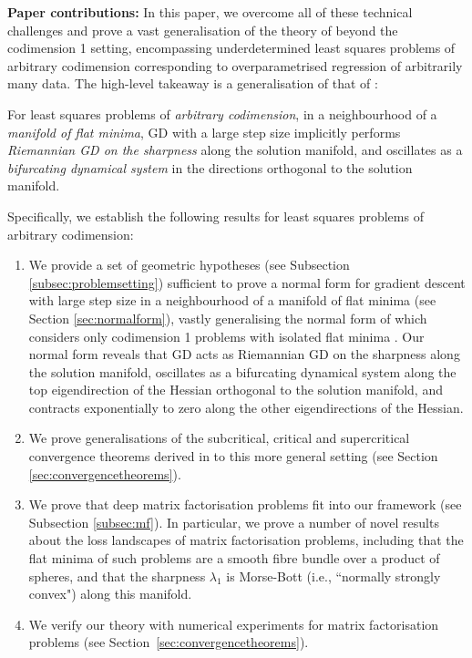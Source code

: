 \documentclass{article}
\theoremstyle{plain}
\theoremstyle{definition}
\theoremstyle{remark}
\begin{document}
\textbf{Paper contributions:} In this paper, we overcome all of these technical challenges and prove a vast generalisation of the theory of \cite{macdonaldeos} beyond the codimension 1 setting, encompassing underdetermined least squares problems of arbitrary codimension corresponding to overparametrised regression of arbitrarily many data. The high-level takeaway is a generalisation of that of \cite{macdonaldeos}:

\begin{tcolorbox}
\centering
For least squares problems of \emph{arbitrary codimension}, in a neighbourhood of a \emph{manifold of flat minima}, GD with a large step size implicitly performs \emph{Riemannian GD on the sharpness} along the solution manifold, and oscillates as a \emph{bifurcating dynamical system} in the directions orthogonal to the solution manifold.
\end{tcolorbox}

Specifically, we establish the following results for least squares problems of arbitrary codimension:
%
\begin{enumerate}[leftmargin=*]
    \item We provide a set of geometric hypotheses (see Subsection \ref{subsec:problemsetting}) sufficient to prove a normal form for gradient descent with large step size in a neighbourhood of a manifold of flat minima (see Section \ref{sec:normalform}), vastly generalising the normal form of \cite{macdonaldeos} which considers only codimension 1 problems with isolated flat minima . Our normal form reveals that GD acts as Riemannian GD on the sharpness along the solution manifold, oscillates as a bifurcating dynamical system along the top eigendirection of the Hessian orthogonal to the solution manifold, and contracts exponentially to zero along the other eigendirections of the Hessian.
    \item We prove generalisations of the subcritical, critical and supercritical convergence theorems derived in \cite{macdonaldeos} to this more general setting (see Section \ref{sec:convergencetheorems}).
    \item We prove that deep matrix factorisation problems fit into our framework (see Subsection \ref{subsec:mf}). In particular, we prove a number of novel results about the loss landscapes of matrix factorisation problems, including that the flat minima of such problems are a smooth fibre bundle over a product of spheres, and that the sharpness $\lambda_1$ is Morse-Bott (i.e., ``normally strongly convex") along this manifold. 
    \item We verify our theory with numerical experiments for matrix factorisation problems (see Section~\ref{sec:convergencetheorems}).
\end{enumerate}
\end{document}
